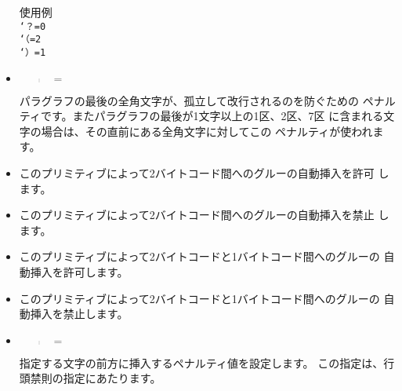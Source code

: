 \begin{itemize}
	\noindent
	使用例\\
	{\tt{}`？=0\\
	`（=2\\
	`）=1}
\item {}
	\begin{quote}
	$=$
	\end{quote}
	パラグラフの最後の全角文字が、孤立して改行されるのを防ぐための
	ペナルティです。またパラグラフの最後が1文字以上の1区、2区、7区
	に含まれる文字の場合は、その直前にある全角文字に対してこの
	ペナルティが使われます。
\item {}
	\begin{quote}
	\end{quote}
	このプリミティブによって2バイトコード間へのグルーの自動挿入を許可
	します。
\item {}
	\begin{quote}
	\end{quote}
	このプリミティブによって2バイトコード間へのグルーの自動挿入を禁止
	します。
\item {}
	\begin{quote}
	\end{quote}
	このプリミティブによって2バイトコードと1バイトコード間へのグルーの
	自動挿入を許可します。
\item {}
	\begin{quote}
	\end{quote}
	このプリミティブによって2バイトコードと1バイトコード間へのグルーの
	自動挿入を禁止します。
\item {}
	\begin{quote}
	$=$
	\end{quote}
	指定する文字の前方に挿入するペナルティ値を設定します。
	この指定は、行頭禁則の指定にあたります。


\end{itemize}
